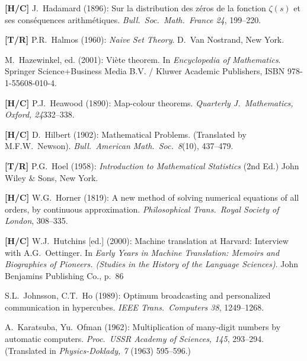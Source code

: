 \begin{thebibliography}{999}

{\bf [H/C]}
J.~Hadamard (1896): Sur la distribution des z\'{e}ros de la fonction $\zeta(s)$ et ses cons\'{e}quences arithm\'{e}tiques.  {\it Bull.~Soc.~Math.~France 24}, 199--220.

{\bf [T/R]}
P.R.~Halmos (1960): {\it Naive Set Theory}.  D.~Van Nostrand, New York.

M.~Hazewinkel, ed. (2001): %
Vi\`{e}te theorem.  In {\it Encyclopedia of Mathematics}.
Springer Science+Business Media B.V. / Kluwer Academic Publishers,
ISBN 978-1-55608-010-4.

{\bf [H/C]}
P.J.~Heawood (1890): Map-colour theorems.  {\it Quarterly J.~Mathematics, Oxford, 24}332--338.

{\bf [H/C]}
D.~Hilbert (1902): Mathematical Problems.  (Translated by M.F.W.~Newson).  {\it Bull.~American Math.~Soc.~8}(10), 437--479.

{\bf [T/R]}
P.G.~Hoel (1958): {\it Introduction to Mathematical Statistics} (2nd Ed.)  John Wiley \& Sons, New York.

{\bf [H/C]}
W.G.~Horner (1819):  A new method of solving numerical equations of all orders, by
continuous approximation. {\it Philosophical Trans.~Royal Society of London}, 308--335.

{\bf [H/C]}
W.J.~Hutchins [ed.] (2000): Machine translation at Harvard: Interview with A.G.~Oettinger.
In {\it Early Years in Machine Translation: Memoirs and Biographies of Pioneers.  (Studies in the History of the Language Sciences)}.  John Benjamins Publishing Co., p.~86







S.L.~Johnsson, C.T.~Ho (1989):  Optimum broadcasting and personalized communication in hypercubes.  {\it IEEE Trans.~Computers 38}, 1249--1268.



A.~Karatsuba, Yu.~Ofman (1962):
Multiplication of many-digit numbers by automatic computers.  {\it Proc.~USSR Academy of Sciences, 145}, 293--294.  (Translated in {\it Physics-Doklady, 7} (1963) 595--596.)


\end{thebibliography}
